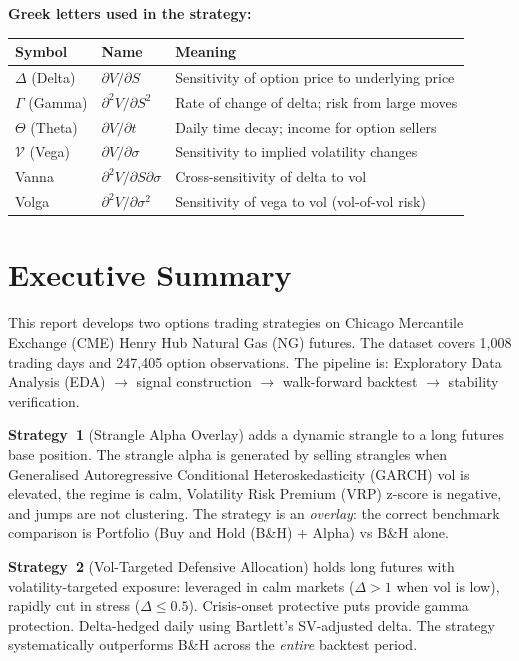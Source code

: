 \documentclass[11pt,a4paper]{article}
\begin{document}
\vspace{1em}

\noindent\textbf{Greek letters used in the strategy:}

\begin{tabularx}{\textwidth}{llX}
\toprule
Symbol & Name & Meaning \\
\midrule
$\Delta$ (Delta) & $\partial V / \partial S$ & Sensitivity of option price to underlying price \\
$\Gamma$ (Gamma) & $\partial^2 V / \partial S^2$ & Rate of change of delta; risk from large moves \\
$\Theta$ (Theta) & $\partial V / \partial t$ & Daily time decay; income for option sellers \\
$\mathcal{V}$ (Vega) & $\partial V / \partial \sigma$ & Sensitivity to implied volatility changes \\
Vanna & $\partial^2 V / \partial S \partial \sigma$ & Cross-sensitivity of delta to vol \\
Volga & $\partial^2 V / \partial \sigma^2$ & Sensitivity of vega to vol (vol-of-vol risk) \\
\bottomrule
\end{tabularx}

\newpage

\section{Executive Summary}

This report develops two options trading strategies on Chicago Mercantile Exchange (CME) Henry Hub Natural Gas (NG) futures. The dataset covers 1,008 trading days and 247,405 option observations. The pipeline is: Exploratory Data Analysis (EDA) $\to$ signal construction $\to$ walk-forward backtest $\to$ stability verification.

\textbf{Strategy~1} (Strangle Alpha Overlay) adds a dynamic strangle to a long futures base position. The strangle alpha is generated by selling strangles when Generalised Autoregressive Conditional Heteroskedasticity (GARCH) vol is elevated, the regime is calm, Volatility Risk Premium (VRP) z-score is negative, and jumps are not clustering. The strategy is an \textit{overlay}: the correct benchmark comparison is Portfolio (Buy and Hold (B\&H) + Alpha) vs B\&H alone.

\textbf{Strategy~2} (Vol-Targeted Defensive Allocation) holds long futures with volatility-targeted exposure: leveraged in calm markets ($\Delta > 1$ when vol is low), rapidly cut in stress ($\Delta \leq 0.5$). Crisis-onset protective puts provide gamma protection. Delta-hedged daily using Bartlett's SV-adjusted delta. The strategy systematically outperforms B\&H across the \emph{entire} backtest period.
\end{document}
